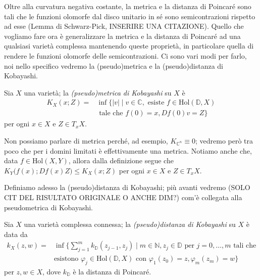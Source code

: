 Oltre alla curvatura negativa costante, la metrica e la distanza di Poincaré sono tali che le funzioni olomorfe dal disco unitario in sé sono semicontrazioni rispetto ad esse (Lemma di Schwarz-Pick, INSERIRE UNA CITAZIONE). Quello che vogliamo fare ora è generalizzare la metrica e la distanza di Poincaré ad una qualsiasi varietà complessa mantenendo queste proprietà, in particolare quella di rendere le funzioni olomorfe delle semicontrazioni. Ci sono vari modi per farlo, noi nello specifico vedremo la (pseudo)metrica e la (pseudo)distanza di Kobayashi.

\begin{defn}
    Sia $X$ una varietà; la \textit{(pseudo)metrica di Kobayashi} su $X$ è
    \begin{equation}\begin{split}
        K_X(x;Z)=&\inf\{|v| \mid v \in \mathbb{C}, \text{ esiste }f \in \text{Hol}(\mathbb{D},X) \\
        &\text{ tale che } f(0)=x, Df(0)v=Z\}
    \end{split}\end{equation}
    per ogni $x \in X$ e $Z \in T_xX$.
\end{defn}

\begin{oss}
    Non possiamo parlare di metrica perché, ad esempio, $K_{\mathbb{C}^n}\equiv 0$; vedremo però tra poco che per i domini limitati è effettivamente una metrica. Notiamo anche che, data $f \in \text{Hol}(X,Y)$, allora dalla definizione segue che $K_Y\big(f(x);Df(x)Z\big) \le K_X(x;Z)$ per ogni $x \in X$ e $Z \in T_xX$.
\end{oss}

Definiamo adesso la (pseudo)distanza di Kobayashi; più avanti vedremo (SOLO CIT DEL RISULTATO ORIGINALE O ANCHE DIM?) com'è collegata alla pseudometrica di Kobayashi.

\begin{defn}
    Sia $X$ una varietà complessa connessa; la \textit{(pseudo)distanza di Kobayashi} su $X$ è data da
    \begin{equation}\begin{split}
        k_X(z,w)=&\inf\Bigg\{\sum_{j=1}^m k_{\mathbb{D}}(z_{j-1},z_j) \mid m \in \mathbb{N}, z_j \in \mathbb{D}\text{ per }j=0,\dots,m\text{ tali che}\\
        &\text{esistono }\varphi_j\in \text{Hol}(\mathbb{D},X) \text{ con } \varphi_1(z_0)=z,\varphi_m(z_m)=w\Bigg\}
    \end{split}\end{equation}
    per $z,w \in X$, dove $k_{\mathbb{D}}$ è la distanza di Poincaré.
\end{defn}

